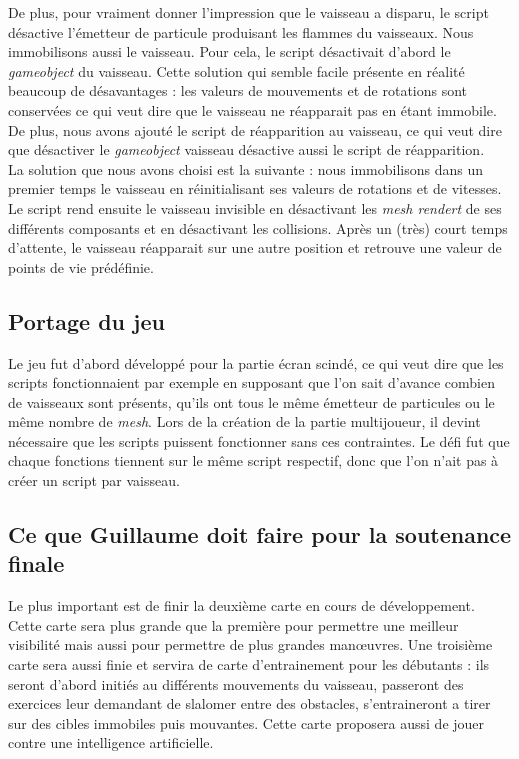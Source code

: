 \documentclass[10pt, titlepage]{report}
\begin{document}
De plus, pour vraiment donner l'impression que le vaisseau a disparu, le script désactive l'émetteur de particule produisant les flammes du vaisseaux. Nous immobilisons aussi le vaisseau. Pour cela, le script désactivait d'abord le \textit{gameobject} du vaisseau. Cette solution qui semble facile présente en réalité beaucoup de désavantages : les valeurs de mouvements et de rotations sont conservées ce qui veut dire que le vaisseau ne réapparait pas en étant immobile. De plus, nous avons ajouté le script de réapparition au vaisseau, ce qui veut dire que désactiver le \textit{gameobject} vaisseau désactive aussi le script de réapparition.\\

 La solution que nous avons choisi est la suivante : nous immobilisons dans un premier temps le vaisseau en réinitialisant ses valeurs de rotations et de vitesses. Le script  rend ensuite le vaisseau invisible en désactivant les \textit{mesh rendert} de ses différents composants et en désactivant les collisions. Après un (très) court temps d'attente, le vaisseau réapparait sur une autre position et retrouve une valeur de points de vie prédéfinie.\\

\subsection{Portage du jeu}

Le jeu fut d'abord développé pour la partie écran scindé, ce qui veut dire que les scripts fonctionnaient par exemple en supposant que l'on sait d'avance combien de vaisseaux sont présents, qu'ils ont tous le même émetteur de particules  ou le même nombre de \textit{mesh}. Lors de la création de la partie multijoueur, il devint nécessaire que les scripts puissent fonctionner sans ces contraintes. Le défi fut que chaque fonctions tiennent sur le même script respectif, donc que l'on n'ait pas à créer un script par vaisseau.\\


\subsection{Ce que Guillaume doit faire pour la soutenance finale}

Le plus important est de finir la deuxième carte en cours de développement. Cette carte sera plus grande que la première pour permettre une meilleur visibilité mais aussi pour permettre de plus grandes manœuvres. Une troisième carte sera aussi finie et servira de  carte d'entrainement pour les débutants : ils seront d'abord initiés au différents mouvements du vaisseau, passeront des exercices leur demandant de slalomer entre des obstacles, s'entraineront a tirer sur des cibles immobiles puis mouvantes. Cette carte proposera aussi de jouer contre une intelligence artificielle.\\
\end{document}
